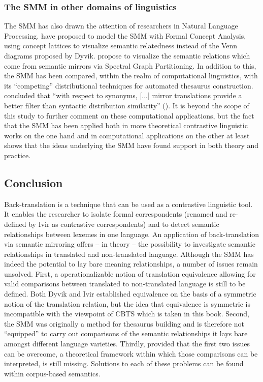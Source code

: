 \subsubsection{The SMM in other domains of linguistics}\largerpage\label{sec:2.3.4.5}  
The SMM has also drawn the attention of researchers in Natural Language Processing. \citet{ganter_conceptual_2005} have proposed to model the SMM with Formal Concept Analysis, using concept lattices to visualize semantic relatedness instead of the Venn diagrams proposed by Dyvik. \citet{elden_computing_2013} propose to visualize the semantic relations which come from semantic mirrors via Spectral Graph Partitioning. In addition to this, the SMM has been compared, within the realm of computational linguistics, with its ``competing'' distributional techniques for automated thesaurus construction. \citeauthor{butz_comparing_2011} concluded that “with respect to synonyms, [...] mirror translations provide a better filter than syntactic distribution similarity” (\citeyear[333]{butz_comparing_2011}). It is beyond the scope of this study to further comment on these computational applications, but the fact that the SMM has been applied both in more theoretical contrastive linguistic works on the one hand and in computational applications on the other at least shows that the ideas underlying the SMM have found support in both theory and practice.

\subsection{Conclusion}
\label{sec:2.3.5}  
Back-translation is a technique that can be used as a contrastive linguistic tool. It enables the researcher to isolate formal correspondents (renamed and re-defined by Ivir as contrastive correspondents) and to detect semantic relationships between lexemes in one language. An application of back-translation via semantic mirroring offers – in theory – the possibility to investigate semantic relationships in translated and non-translated language. Although the SMM has indeed the potential to lay bare meaning relationships, a number of issues remain unsolved. First, a operationalizable notion of translation equivalence allowing for valid comparisons between translated to non-translated language is still to be defined. Both Dyvik and Ivir established equivalence on the basis of a symmetric notion of the translation relation, but the idea that equivalence is symmetric is incompatible with the viewpoint of CBTS which is taken in this book. Second, the SMM was originally a method for thesaurus building and is therefore not ``equipped'' to carry out comparisons of the semantic relationships it lays bare amongst different language varieties. Thirdly, provided that the first two issues can be overcome, a theoretical framework within which those comparisons can be interpreted, is still missing. Solutions to each of these problems can be found within corpus-based semantics.

